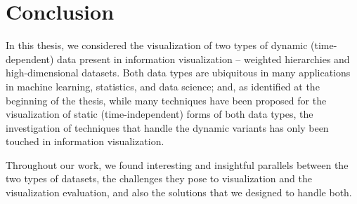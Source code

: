 \chapter{Conclusion}






In this thesis, we considered the visualization of two types of dynamic (time-dependent) data present in information visualization -- weighted hierarchies and high-dimensional datasets. Both data types are ubiquitous in many applications in machine learning, statistics, and data science; and, as identified at the beginning of the thesis, while many techniques have been proposed for the visualization of static (time-independent) forms of both data types, the investigation of techniques that handle the dynamic variants has only been touched in information visualization.

Throughout our work, we found interesting and insightful parallels between the two types of datasets, the challenges they pose to visualization and the visualization evaluation, and also the solutions that we designed to handle both.

